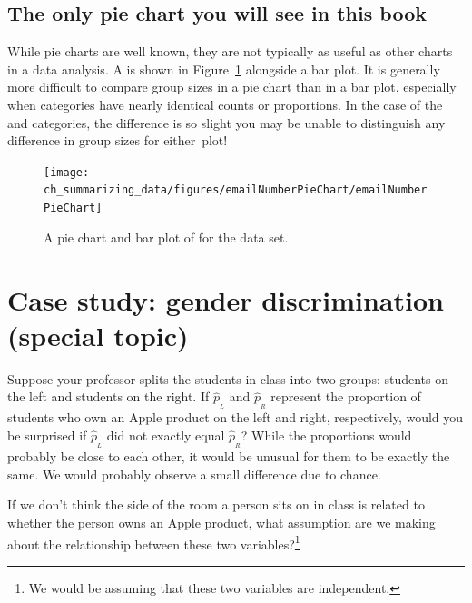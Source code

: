 \subsection{The only pie chart you will see in this book}

While pie charts are well known, they are not typically as useful as other charts in a data analysis. A  is shown in Figure~\ref{emailNumberPieChart} alongside a bar plot. It is generally more difficult to compare group sizes in a pie chart than in a bar plot, especially when categories have nearly identical counts or proportions. In the case of the  and  categories, the difference is so slight you may be unable to distinguish any difference in group sizes for either~plot!

\begin{figure}
   \centering
   \texttt{[image: ch\_summarizing\_data/figures/emailNumberPieChart/emailNumberPieChart]}
   \caption{A pie chart and bar plot of  for the  data set.}
   \label{emailNumberPieChart}
\end{figure}



\section{Case study: gender discrimination (special topic)}
\label{caseStudyGenderDiscrimination}


\begin{example}{Suppose your professor splits the students in class into two groups: students on the left and students on the right. If $\hat{p}_{_L}$ and $\hat{p}_{_R}$ represent the proportion of students who own an Apple product on the left and right, respectively, would you be surprised if $\hat{p}_{_L}$ did not {exactly} equal $\hat{p}_{_R}$?}\label{classRightLeftSideApple}
While the proportions would probably be close to each other, it would be unusual for them to be exactly the same. We would probably observe a small difference due to {chance}.
\end{example}

\begin{exercise}
If we don't think the side of the room a person sits on in class is related to whether the person owns an Apple product, what assumption are we making about the relationship between these two variables?\footnote{We would be assuming that these two variables are independent.}
\end{exercise}

